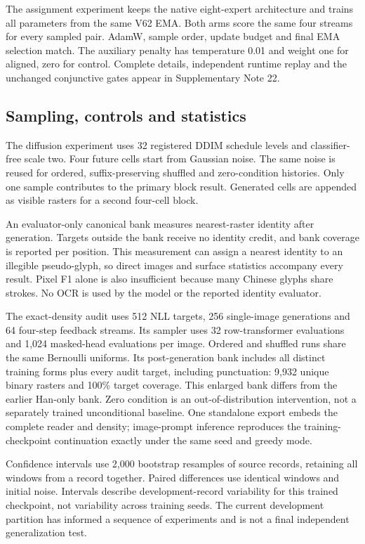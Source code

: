 The assignment experiment keeps the native eight-expert architecture and
trains all parameters from the same V62 EMA. Both arms score the same four
streams for every sampled pair. AdamW, sample order, update budget and final
EMA selection match. The auxiliary penalty has temperature 0.01 and weight
one for aligned, zero for control. Complete details, independent runtime
replay and the unchanged conjunctive gates appear in Supplementary Note 22.

\subsection*{Sampling, controls and statistics}
The diffusion experiment uses 32 registered DDIM schedule levels and classifier-free scale
two. Four future cells start from Gaussian noise. The same noise is reused for
ordered, suffix-preserving shuffled and zero-condition histories. Only one
sample contributes to the primary block result. Generated cells are appended
as visible rasters for a second four-cell block.

An evaluator-only canonical bank measures nearest-raster identity after
generation. Targets outside the bank receive no identity credit, and bank
coverage is reported per position. This measurement can assign a nearest
identity to an illegible pseudo-glyph, so direct images and surface statistics
accompany every result. Pixel F1 alone is also insufficient because many
Chinese glyphs share strokes. No OCR is used by the model or the reported
identity evaluator.

The exact-density audit uses 512 NLL targets, 256 single-image generations and
64 four-step feedback streams. Its sampler uses 32 row-transformer evaluations
and 1,024 masked-head evaluations per image. Ordered and shuffled runs share
the same Bernoulli uniforms. Its post-generation bank includes all distinct
training forms plus every audit target, including punctuation: 9,932 unique
binary rasters and 100\% target coverage. This enlarged bank differs from the
earlier Han-only bank. Zero condition is an out-of-distribution intervention,
not a separately trained unconditional baseline. One standalone export embeds
the complete reader and density; image-prompt inference reproduces the
training-checkpoint continuation exactly under the same seed and greedy mode.

Confidence intervals use 2,000 bootstrap resamples of source records, retaining
all windows from a record together. Paired differences use identical windows
and initial noise. Intervals describe development-record variability for this
trained checkpoint, not variability across training seeds. The current
development partition has informed a sequence of experiments and is not a
final independent generalization test.

